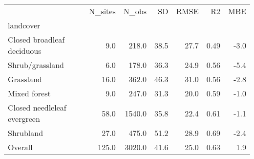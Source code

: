\begin{tabular}{lrrrrrr}
\toprule
{} &  N\_sites &   N\_obs &    SD &  RMSE &    R2 &  MBE \\
landcover                   &          &         &       &       &       &      \\
\midrule
Closed broadleaf deciduous  &      9.0 &   218.0 &  38.5 &  27.7 &  0.49 & -3.0 \\
Shrub/grassland             &      6.0 &   178.0 &  36.3 &  24.9 &  0.56 & -5.4 \\
Grassland                   &     16.0 &   362.0 &  46.3 &  31.0 &  0.56 & -2.8 \\
Mixed forest                &      9.0 &   247.0 &  31.3 &  20.0 &  0.59 & -1.0 \\
Closed needleleaf evergreen &     58.0 &  1540.0 &  35.8 &  22.4 &  0.61 & -1.1 \\
Shrubland                   &     27.0 &   475.0 &  51.2 &  28.9 &  0.69 & -2.4 \\
Overall                     &    125.0 &  3020.0 &  41.6 &  25.0 &  0.63 &  1.9 \\
\bottomrule
\end{tabular}

